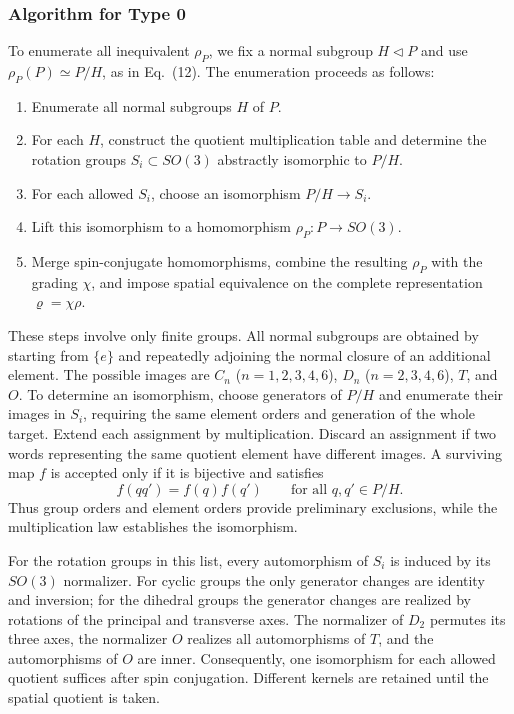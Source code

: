 \documentclass{article}
\begin{document}
\subsubsection{Algorithm for Type 0}

To enumerate all inequivalent $\rho_P$, we fix a normal subgroup
$H\lhd P$ and use $\rho_P(P)\simeq P/H$, as in Eq.~(12).
The enumeration proceeds as follows:
\begin{enumerate}
\renewcommand{\labelenumi}{(\roman{enumi})}
\item Enumerate all normal subgroups $H$ of $P$.
\item For each $H$, construct the quotient multiplication table and
determine the rotation groups $S_i\subset SO(3)$ abstractly isomorphic
to $P/H$.
\item For each allowed $S_i$, choose an isomorphism $P/H\to S_i$.
\item Lift this isomorphism to a homomorphism $\rho_P:P\to SO(3)$.
\item Merge spin-conjugate homomorphisms, combine the resulting
$\rho_P$ with the grading $\chi$, and impose spatial equivalence on
the complete representation $\varrho=\chi\rho$.
\end{enumerate}

These steps involve only finite groups. All normal subgroups are
obtained by starting from $\{e\}$ and repeatedly adjoining the normal
closure of an additional element. The possible images are $C_n$
($n=1,2,3,4,6$), $D_n$ ($n=2,3,4,6$), $T$, and $O$.
To determine an isomorphism, choose generators of $P/H$ and enumerate
their images in $S_i$, requiring the same element orders and generation
of the whole target. Extend each assignment by multiplication. Discard
an assignment if two words representing the same quotient element
have different images. A surviving map $f$ is accepted only if it is
bijective and satisfies
\[
 f(qq')=f(q)f(q')\qquad\text{for all }q,q'\in P/H.
\]
Thus group orders and element orders provide preliminary exclusions,
while the multiplication law establishes the isomorphism.

For the rotation groups in this list, every automorphism of $S_i$
is induced by its $SO(3)$ normalizer. For cyclic groups the only
generator changes are identity and inversion; for the dihedral groups
the generator changes are realized by rotations of the principal and
transverse axes. The normalizer of $D_2$ permutes its three axes,
the normalizer $O$ realizes all automorphisms of $T$, and the
automorphisms of $O$ are inner. Consequently, one isomorphism for
each allowed quotient suffices after spin conjugation. Different
kernels are retained until the spatial quotient is taken.
\end{document}
